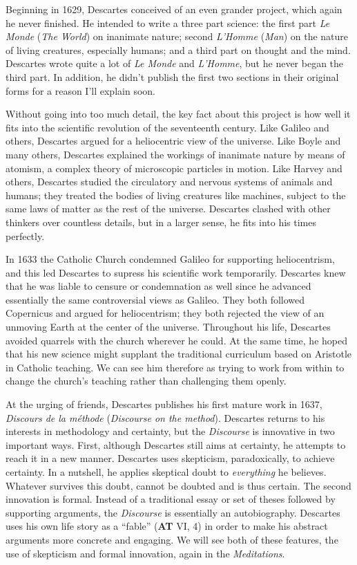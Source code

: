 Beginning in 1629, Descartes conceived of an even grander project, which again he never finished. He intended to write a three part science: the first part \textit{Le Monde} (\textit{The World}) on inanimate nature; second \textit{L'Homme} (\textit{Man}) on the nature of living creatures, especially humans; and a third part on thought and the mind. Descartes wrote quite a lot of \textit{Le Monde} and \textit{L'Homme}, but he never began the third part. In addition, he didn't publish the first two sections in their original forms for a reason I'll explain soon.

Without going into too much detail, the key fact about this project is how well it fits into the scientific revolution of the seventeenth century. Like Galileo and others, Descartes argued for a heliocentric view of the universe. Like Boyle and many others, Descartes explained the workings of inanimate nature by means of atomism, a complex theory of microscopic particles in motion. Like Harvey and others, Descartes studied the circulatory and nervous systems of animals and humans; they treated the bodies of living creatures like machines, subject to the same laws of matter as the rest of the universe. Descartes clashed with other thinkers over countless details, but in a larger sense, he fits into his times perfectly.

In 1633 the Catholic Church condemned Galileo for supporting heliocentrism, and this led Descartes to supress his scientific work temporarily. Descartes knew that he was liable to censure or condemnation as well since he advanced essentially the same controversial views as Galileo. They both followed Copernicus and argued for heliocentrism; they both rejected the view of an unmoving Earth at the center of the universe. Throughout his life, Descartes avoided quarrels with the church wherever he could. At the same time, he hoped that his new science might supplant the traditional curriculum based on Aristotle in Catholic teaching. We can see him therefore as trying to work from within to change the church's teaching rather than challenging them openly.

At the urging of friends, Descartes publishes his first mature work in 1637, \textit{Discours de la méthode} (\textit{Discourse on the method}). Descartes returns to his interests in methodology and certainty, but the \textit{Discourse} is innovative in two important ways. First, although Descartes still aims at certainty, he attempts to reach it in a new manner. Descartes uses skepticism, paradoxically, to achieve certainty. In a nutshell, he applies skeptical doubt to \textit{everything} he believes. Whatever survives this doubt, cannot be doubted and is thus certain. The second innovation is formal. Instead of a traditional essay or set of theses followed by supporting arguments, the \textit{Discourse} is essentially an autobiography. Descartes uses his own life story as a ``fable'' (\textbf{AT} VI, 4) in order to make his abstract arguments more concrete and engaging. We will see both of these features, the use of skepticism and formal innovation, again in the \textit{Meditations}.

